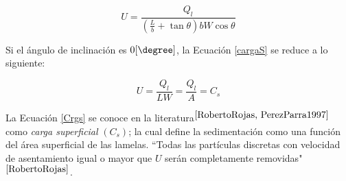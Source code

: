 \begin{equation}
	\boxed{U = \frac{Q_l}{\left(\frac{L}{b} +  \tan \theta \right) b W \cos \theta } }
	\label{cargaS}
\end{equation}

\noindent
\justify

Si el \'angulo de inclinaci\'on es $0 [\degree]$, la Ecuaci\'on \ref{cargaS} se reduce a lo siguiente:

\begin{equation}
	U = \frac{Q_l}{L W} = \frac{Q_l}{A} = C_s
	\label{Crgs}
\end{equation}

\noindent
\justify

La Ecuaci\'on \ref{Crgs} se conoce en la literatura$^{\cite{RobertoRojas, PerezParra1997}}$ como \textit{carga superficial} $(C_s)$; la cual define la sedimentaci\'on como una funci\'on del \'area superficial de las lamelas. ``Todas las part\'iculas discretas con velocidad de asentamiento igual o mayor que $U$ ser\'an completamente removidas"$^{\cite{RobertoRojas}}$.
